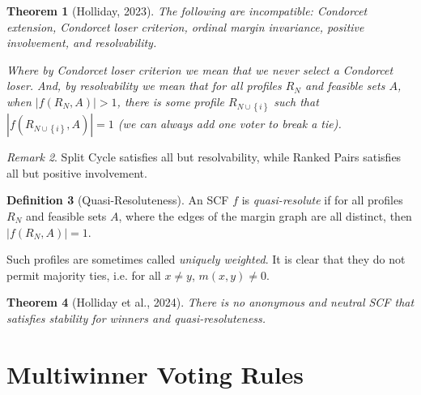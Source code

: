 \documentclass{book}
\theoremstyle{plain}
\newtheorem{theorem}{Theorem}[subsection]
\theoremstyle{definition}
\newtheorem{definition}[theorem]{Definition}
\theoremstyle{remark}
\newtheorem{remark}[theorem]{Remark}
\newtheorem*{comment}{Comment}
\newcommand{\set}[1]{\left\{#1\right\}}
\begin{document}

\begin{theorem}[Holliday, 2023]
    The following are incompatible:
    Condorcet extension, 
    Condorcet loser criterion, 
    ordinal margin invariance, 
    positive involvement, and 
    resolvability.

    Where by \emph{Condorcet loser criterion} we mean that we 
    never select a Condorcet loser. 
    And, by \emph{resolvability} we mean that for all profiles $R_N$ and feasible sets $A$,
    when $|f(R_N, A)| > 1$, there is some profile $R_{N \cup \set{i}}$ such that 
    $|f(R_{N \cup \set{i}}, A)| = 1$ (we can always add one voter to break a tie).
\end{theorem}

\begin{remark}
    Split Cycle satisfies all but resolvability,
    while Ranked Pairs satisfies all but positive involvement.
\end{remark}

\begin{definition}[Quasi-Resoluteness]
    An SCF $f$ is \emph{quasi-resolute} if for all profiles $R_N$ and feasible sets $A$,
    where the edges of the margin graph are all 
    distinct, then $|f(R_N, A)| = 1$.

    Such profiles are sometimes called 
    \emph{uniquely weighted}. It is clear that they do not 
    permit majority ties, i.e. for all $x \neq y$, $m(x, y) \neq 0$.
\end{definition}

\begin{theorem}[Holliday et al., 2024]
    There is no anonymous and neutral SCF that 
    satisfies stability for winners and 
    quasi-resoluteness.
\end{theorem}


\chapter{Multiwinner Voting Rules}
\end{document}
